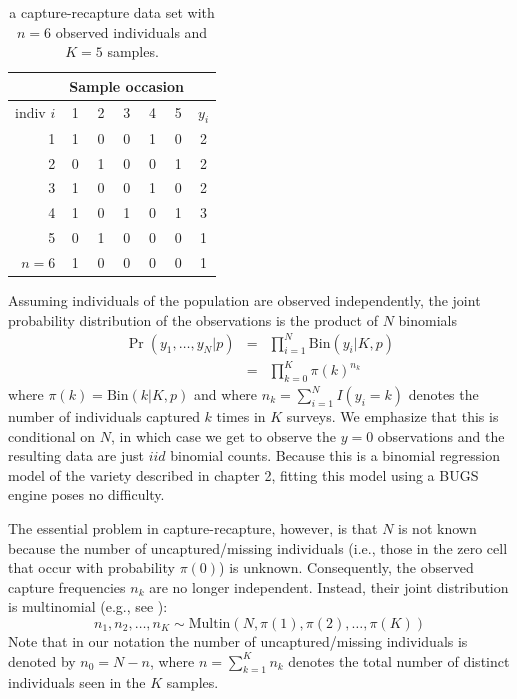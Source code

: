 \begin{table}
\centering
\caption{a capture-recapture data set with $n=6$ observed individuals
and $K=5$ samples.}
\begin{tabular}{r|ccccc|c}
&  \multicolumn{5}{c}{Sample occasion} &  \\ \hline
 indiv $i$ &  1 & 2 & 3 & 4 & 5 & $y_{i}$ \\ \hline
  1 &     1 & 0 & 0 & 1 & 0  & 2   \\
  2 &     0 & 1 & 0 & 0 & 1  & 2   \\
  3 &     1 & 0 & 0 & 1 & 0  & 2   \\
  4 &     1 & 0 & 1 & 0 & 1  & 3   \\
  5 &     0 & 1 & 0 & 0 & 0  & 1   \\
  $n=6$ & 1 & 0 & 0 & 0 & 0  & 1   \\ \hline
\end{tabular}
\label{tab.3.1}
\end{table}

Assuming individuals of the population are observed independently, the 
joint probability distribution of the observations is the product of 
$N$ binomials
\begin{eqnarray*}
  \Pr(y_1, \ldots, y_N | p) &=& \prod_{i=1}^N  \mathrm{Bin}(y_i | K, p) \\
   &=& \prod_{k=0}^K  \pi(k)^{n_k}
\end{eqnarray*}
where $\pi(k) = \mathrm{Bin}(k | K,p)$ and where $n_k = \sum_{i=1}^N
I(y_i = k)$ denotes the number of individuals captured $k$ times in
$K$ surveys. We emphasize that this is conditional on $N$, in which
case we get to observe the $y=0$ observations and the resulting data
are just $iid$ binomial counts. Because this is a binomial regression
model of the variety described in chapter 2, fitting this model using
a BUGS engine poses no difficulty.

The essential problem in capture-recapture, however, is that $N$ is
not known because the number of uncaptured/missing individuals (i.e.,
those in the zero cell that occur with probability $\pi(0)$) is
unknown.  Consequently, the observed capture frequencies $n_k$ are no
longer independent. Instead, their joint distribution is multinomial
(e.g., see \citet[][p. xyz]{illian_etal:2008}):
\begin{equation}
\label{eq:multinomialForM0}
    n_1, n_2, \ldots, n_K \sim \mathrm{Multin}(N, \pi(1), \pi(2), \ldots, \pi(K))
\end{equation}
Note that in our notation the number of uncaptured/missing individuals is 
denoted by $n_0 = N - n$, where $n = \sum_{k=1}^K n_k$ denotes the total 
number of distinct individuals seen in the $K$ samples.

